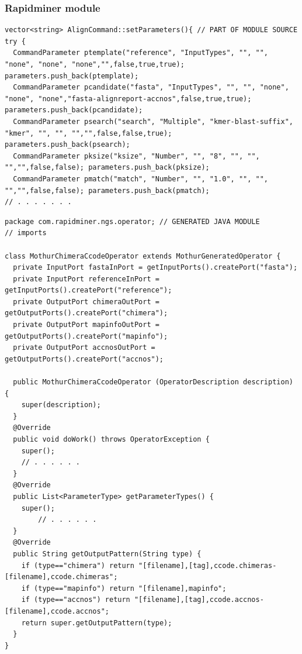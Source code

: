 \documentclass[10pt]{beamer}
\begin{document}
\begin{frame}[fragile]
  \frametitle{Rapidminer module}
\begin{verbatim}
vector<string> AlignCommand::setParameters(){ // PART OF MODULE SOURCE
try {
  CommandParameter ptemplate("reference", "InputTypes", "", "", "none", "none", "none","",false,true,true); parameters.push_back(ptemplate);
  CommandParameter pcandidate("fasta", "InputTypes", "", "", "none", "none", "none","fasta-alignreport-accnos",false,true,true); parameters.push_back(pcandidate);
  CommandParameter psearch("search", "Multiple", "kmer-blast-suffix", "kmer", "", "", "","",false,false,true); parameters.push_back(psearch);
  CommandParameter pksize("ksize", "Number", "", "8", "", "", "","",false,false); parameters.push_back(pksize);
  CommandParameter pmatch("match", "Number", "", "1.0", "", "", "","",false,false); parameters.push_back(pmatch);
// . . . . . . .
\end{verbatim}
\begin{verbatim}
package com.rapidminer.ngs.operator; // GENERATED JAVA MODULE
// imports

class MothurChimeraCcodeOperator extends MothurGeneratedOperator {
  private InputPort fastaInPort = getInputPorts().createPort("fasta");
  private InputPort referenceInPort = getInputPorts().createPort("reference");
  private OutputPort chimeraOutPort = getOutputPorts().createPort("chimera");
  private OutputPort mapinfoOutPort = getOutputPorts().createPort("mapinfo");
  private OutputPort accnosOutPort = getOutputPorts().createPort("accnos");

  public MothurChimeraCcodeOperator (OperatorDescription description) {
    super(description);
  }
  @Override
  public void doWork() throws OperatorException {
    super();
    // . . . . . .
  }
  @Override
  public List<ParameterType> getParameterTypes() {
    super();
        // . . . . . .
  }
  @Override
  public String getOutputPattern(String type) {
    if (type=="chimera") return "[filename],[tag],ccode.chimeras-[filename],ccode.chimeras";
    if (type=="mapinfo") return "[filename],mapinfo";
    if (type=="accnos") return "[filename],[tag],ccode.accnos-[filename],ccode.accnos";
    return super.getOutputPattern(type);
  }
}
\end{verbatim}
\end{frame}
\end{document}
